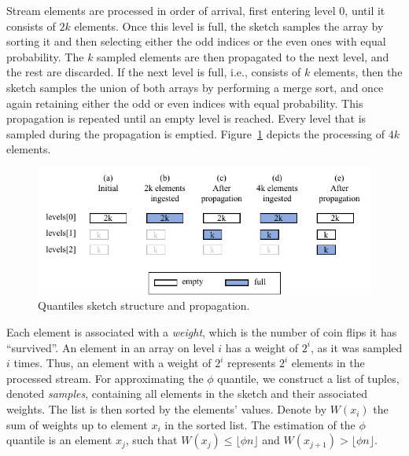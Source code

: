 Stream elements are processed in order of arrival, first entering level $0$, until it consists of $2k$ elements. Once this level is full, the sketch samples the array by sorting it and then selecting either the odd indices or the even ones with equal probability. The $k$ sampled elements are then propagated to the next level, and the rest are discarded. If the next level is full, i.e., consists of $k$ elements, then the sketch samples the union of both arrays by performing a merge sort, and once again retaining either the odd or even indices with equal probability. This propagation is repeated until an empty level is reached. Every level that is sampled during the propagation is emptied. Figure~\ref{fig: quantiles_sketch} depicts the processing of $4k$ elements.

\begin{figure}[h]
    \centering
    \includegraphics[width=\columnwidth]{graphics/sequential/seq_propagation.pdf}
    \caption{Quantiles sketch structure and propagation.}
    \label{fig: quantiles_sketch}
\end{figure}


Each element is associated with a \emph{weight}, which is the number of coin flips it has ``survived''. An element in an array on level $i$ has a weight of $2^i$, as it was sampled $i$ times. Thus, an element with a weight of $2^i$ represents $2^i$ elements in the processed stream.
For approximating the $\phi$ quantile, we construct a list of tuples, denoted \emph{samples}, containing all elements in the sketch and their associated weights. The list is then sorted by the elements' values. Denote by $W(x_i)$ the sum of weights up to element $x_i$ in the sorted list. The estimation of the $\phi$ quantile is an element $x_j$, such that $W(x_j) \leq \lfloor\phi n\rfloor$ and $W(x_{j+1}) > \lfloor\phi n\rfloor$.